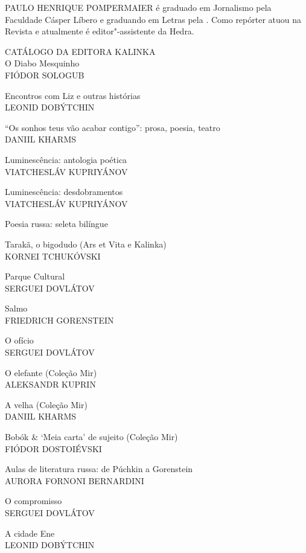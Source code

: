 \medskip

\noindent{}PAULO HENRIQUE POMPERMAIER é graduado em Jornalismo pela Faculdade Cásper Líbero e graduando em Letras pela \scalebox{0.8}{USP}. Como repórter atuou na Revista {} e atualmente é editor"-assistente da Hedra.

\afterpage{\blankpage}

\newpage
\pagestyle{empty}
\MyriadPro

\footnotesize{
\noindent{}CATÁLOGO DA EDITORA KALINKA\\[5pt]

\noindent{}O Diabo Mesquinho\\
FIÓDOR SOLOGUB
\medskip

\noindent{}Encontros com Liz e outras histórias\\
LEONID DOBÝTCHIN
\medskip

\noindent{}“Os sonhos teus vão acabar contigo”: prosa, poesia, teatro\\
DANIIL KHARMS
\medskip

\noindent{}Luminescência: antologia poética\\
VIATCHESLÁV KUPRIYÁNOV
\medskip

\noindent{}Luminescência: desdobramentos\\
VIATCHESLÁV KUPRIYÁNOV
\medskip

\noindent{}Poesia russa: seleta bilíngue
\medskip

\noindent{}Tarakã, o bigodudo (Ars et Vita e Kalinka)\\
KORNEI TCHUKÓVSKI
\medskip

\noindent{}Parque Cultural\\
SERGUEI DOVLÁTOV
\medskip

\noindent{}Salmo\\
FRIEDRICH GORENSTEIN
\medskip

\noindent{}O ofício\\
SERGUEI DOVLÁTOV
\medskip

\noindent{}O elefante (Coleção Mir)\\
ALEKSANDR KUPRIN
\medskip

\noindent{}A velha (Coleção Mir)\\
DANIIL KHARMS 
\medskip

\noindent{}Bobók \& ‘Meia carta’ de sujeito (Coleção Mir)\\
FIÓDOR DOSTOIÉVSKI
\medskip

\noindent{}Aulas de literatura russa: de Púchkin a Gorenstein \\
AURORA FORNONI BERNARDINI
\medskip

\noindent{}O compromisso\\
SERGUEI DOVLÁTOV
\medskip

\noindent{}A cidade Ene \\
LEONID DOBÝTCHIN
}

